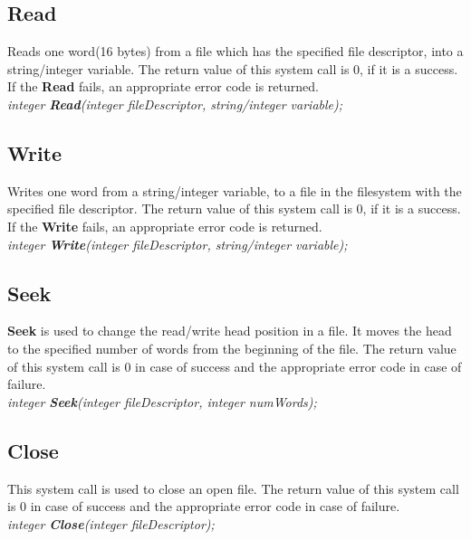 \documentclass[11pt]{article}
\begin{document}
\subsection{Read}
Reads one word(16 bytes) from a file which has the specified file descriptor, into a string/integer variable. The return value of this system call is 0, if it is a success. If the \textbf{Read} fails, an appropriate error code is returned.\\

\textit{integer \textbf{Read}(integer fileDescriptor, string/integer variable);}





\subsection{Write}
Writes one word from a string/integer variable, to a file in the filesystem with the specified file descriptor. The return value of this system call is 0, if it is a success. If the \textbf{Write} fails, an appropriate error code is returned.\\

\textit{integer \textbf{Write}(integer fileDescriptor, string/integer variable);}





\subsection{Seek}

\textbf{Seek} is used to change the read/write head position in a file. It moves the head to the specified number of words from the beginning of the file. The return value of this system call is 0 in case of success and the appropriate error code in case of failure.\\

\textit{integer \textbf{Seek}(integer fileDescriptor, integer numWords);}
 
 
 
 
 \subsection{Close}
This system call is used to close an open file. The return value of this system call is 0 in case of success and the appropriate error code in case of failure.\\

\textit{integer \textbf{Close}(integer fileDescriptor);}
\end{document}
